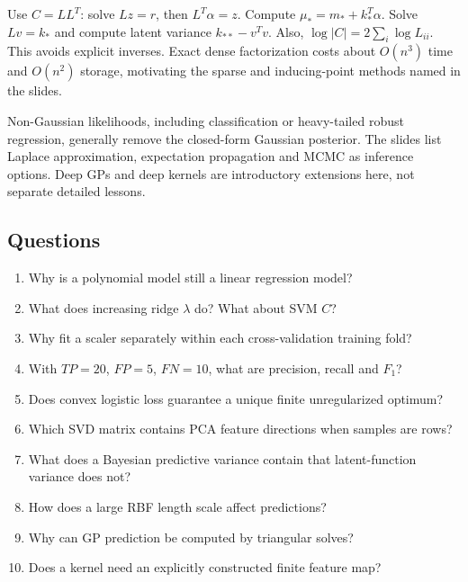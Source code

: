 \documentclass[11pt]{article}
\begin{document}
Use $C=LL^T$: solve $Lz=r$, then $L^T\alpha=z$. Compute $\mu_*=m_*+k_*^T\alpha$. Solve $Lv=k_*$ and compute latent variance $k_{**}-v^Tv$. Also, $\log|C|=2\sum_i\log L_{ii}$. This avoids explicit inverses. Exact dense factorization costs about $O(n^3)$ time and $O(n^2)$ storage, motivating the sparse and inducing-point methods named in the slides.

Non-Gaussian likelihoods, including classification or heavy-tailed robust regression, generally remove the closed-form Gaussian posterior. The slides list Laplace approximation, expectation propagation and MCMC as inference options. Deep GPs and deep kernels are introductory extensions here, not separate detailed lessons.
\subsection{Questions}
\begin{enumerate}
\item Why is a polynomial model still a linear regression model?
\item What does increasing ridge $\lambda$ do? What about SVM $C$?
\item Why fit a scaler separately within each cross-validation training fold?
\item With $TP=20$, $FP=5$, $FN=10$, what are precision, recall and $F_1$?
\item Does convex logistic loss guarantee a unique finite unregularized optimum?
\item Which SVD matrix contains PCA feature directions when samples are rows?
\item What does a Bayesian predictive variance contain that latent-function variance does not?
\item How does a large RBF length scale affect predictions?
\item Why can GP prediction be computed by triangular solves?
\item Does a kernel need an explicitly constructed finite feature map?
\end{enumerate}
\end{document}
